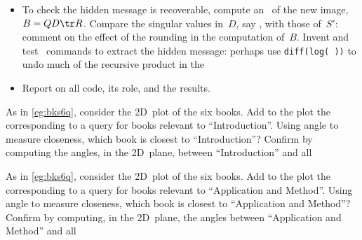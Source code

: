 \begin{OmitV1}
\begin{exercise}
\begin{itemize}
It is this image that contains the hidden message.

\item To check the hidden message is recoverable, compute an \svd\ of the new image, \(B=QD\tr R\).
Compare the singular values in~\(D\), say \hlist{}, with those of~\(S'\): comment on the effect of the rounding in the computation of~\(B\).
Invent and test \script\ commands to extract the hidden message: 
perhaps use \verb|diff(log( ))| to undo much of the recursive product in the 

\item Report on all code, its role, and the results.

\end{itemize}
\end{exercise}
\end{OmitV1}

\begin{exercise}  
As in \cref{eg:bks6q}, consider the 2D~plot of the six books. Add to the plot the  corresponding to a query for books relevant to ``Introduction''.
Using angle to measure closeness, which book is closest to ``Introduction''?  
Confirm by computing the angles, in the 2D~plane, between ``Introduction'' and all 
\end{exercise}



\begin{exercise}  
As in \cref{eg:bks6q}, consider the 2D~plot of the six books. Add to the plot the  corresponding to a query for books relevant to ``Application and Method''.
Using angle to measure closeness, which book is closest to ``Application and Method''?  
Confirm by computing, in the 2D~plane, the angles between ``Application and Method'' and all 
\end{exercise}




